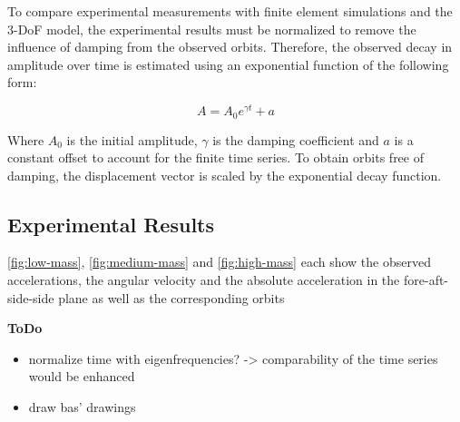 \documentclass{article}
\begin{document}
To compare experimental measurements with finite element simulations and the 3-DoF model, the experimental results must be normalized to remove the influence of damping from the observed orbits. Therefore, the observed decay in amplitude over time is estimated using an exponential function of the following form:

\begin{equation}
    A = A_0 e ^ {\gamma t} + a
\end{equation}

Where $A_0$ is the initial amplitude, $\gamma$ is the damping coefficient and $a$ is a constant offset to account for the finite time series. To obtain orbits free of damping, the displacement vector is scaled by the exponential decay function. 

\subsection{Experimental Results}

\autoref{fig:low-mass}, \autoref{fig:medium-mass} and \autoref{fig:high-mass} each show the observed accelerations, the angular velocity and the absolute acceleration in the fore-aft-side-side plane as well as the corresponding orbits

\textbf{ToDo}

\begin{itemize}
    \item normalize time with eigenfrequencies? -> comparability of the time series would be enhanced
    \item draw bas' drawings
\end{itemize}

\end{document}
